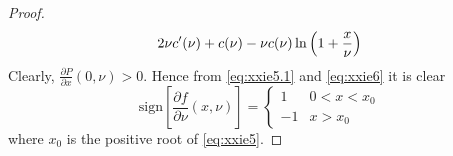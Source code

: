 \documentclass{article}
\newcommand{\pd}[2]{
  \frac{\partial #1}{\partial #2}
}
\newcommand{\1}[1]{
  \mathbf{1}_{\{#1\}}
}
\begin{document}
\begin{proof}
\begin{eqnarray}
    2 \nu c'(\nu) + c(\nu) - \nu c(\nu) \ln\left(
      1 + {x \over \nu}
    \right)
    \label{eq:xxie6}
  \end{eqnarray}
  Clearly, $\pd{P}{x}(0, \nu) > 0$. Hence from \eqref{eq:xxie5.1} and
  \eqref{eq:xxie6} it is clear
  \begin{equation*}
    \text{sign}\left[
      \pd{f}{\nu}(x, \nu)
    \right]
    = \left\{
    \begin{array}{rl}
      1 & 0 < x < x_0 \\
      -1 & x > x_0
    \end{array}
    \right.
  \end{equation*}
  where $x_0$ is the positive root of \eqref{eq:xxie5}.
\end{proof}



\end{document}
